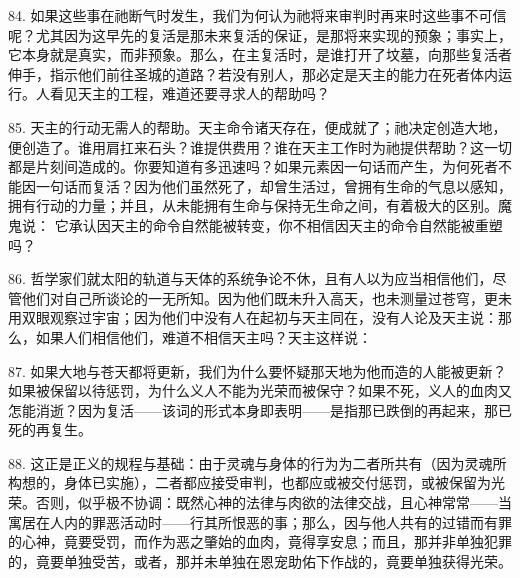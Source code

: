 84. 如果这些事在祂断气时发生，我们为何认为祂将来审判时再来时这些事不可信呢？尤其因为这早先的复活是那未来复活的保证，是那将来实现的预象；事实上，它本身就是真实，而非预象。那么，在主复活时，是谁打开了坟墓，向那些复活者伸手，指示他们前往圣城的道路？若没有别人，那必定是天主的能力在死者体内运行。人看见天主的工程，难道还要寻求人的帮助吗？\par

85. 天主的行动无需人的帮助。天主命令诸天存在，便成就了；祂决定创造大地，便创造了。谁用肩扛来石头？谁提供费用？谁在天主工作时为祂提供帮助？这一切都是片刻间造成的。你要知道有多迅速吗？如果元素因一句话而产生，为何死者不能因一句话而复活？因为他们虽然死了，却曾生活过，曾拥有生命的气息以感知，拥有行动的力量；并且，从未能拥有生命与保持无生命之间，有着极大的区别。魔鬼说： 它承认因天主的命令自然能被转变，你不相信因天主的命令自然能被重塑吗？\par

86. 哲学家们就太阳的轨道与天体的系统争论不休，且有人以为应当相信他们，尽管他们对自己所谈论的一无所知。因为他们既未升入高天，也未测量过苍穹，更未用双眼观察过宇宙；因为他们中没有人在起初与天主同在，没有人论及天主说：那么，如果人们相信他们，难道不相信天主吗？天主这样说：\par

87. 如果大地与苍天都将更新，我们为什么要怀疑那天地为他而造的人能被更新？如果被保留以待惩罚，为什么义人不能为光荣而被保守？如果不死，义人的血肉又怎能消逝？因为复活——该词的形式本身即表明——是指那已跌倒的再起来，那已死的再复生。\par

88. 这正是正义的规程与基础：由于灵魂与身体的行为为二者所共有（因为灵魂所构想的，身体已实施），二者都应接受审判，也都应或被交付惩罚，或被保留为光荣。否则，似乎极不协调：既然心神的法律与肉欲的法律交战，且心神常常——当寓居在人内的罪恶活动时——行其所恨恶的事；那么，因与他人共有的过错而有罪的心神，竟要受罚，而作为恶之肇始的血肉，竟得享安息；而且，那并非单独犯罪的，竟要单独受苦，或者，那并未单独在恩宠助佑下作战的，竟要单独获得光荣。\par

